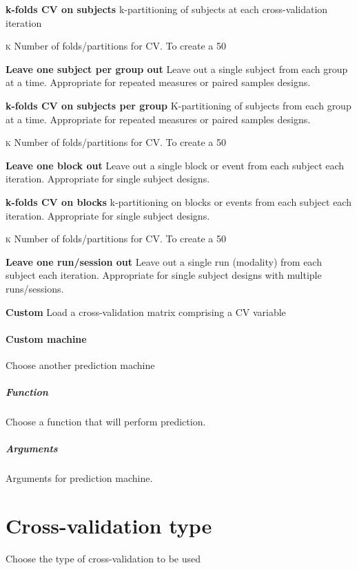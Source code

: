 \textbf{k-folds CV on subjects}
k-partitioning of subjects at each cross-validation iteration


\textsc{k}
Number of folds/partitions for CV. To create a 50%


\textbf{Leave one subject per group out}
Leave out a single subject from each group at a time. Appropriate for repeated measures or paired samples designs.


\textbf{k-folds CV on subjects per group}
K-partitioning of subjects from each group at a time. Appropriate for repeated measures or paired samples designs.


\textsc{k}
Number of folds/partitions for CV. To create a 50%


\textbf{Leave one block out}
Leave out a single block or event from each subject each iteration. Appropriate for single subject designs.


\textbf{k-folds CV on blocks}
k-partitioning on blocks or events from each subject each iteration. Appropriate for single subject designs.


\textsc{k}
Number of folds/partitions for CV. To create a 50%


\textbf{Leave one run/session out}
Leave out a single run (modality) from each subject each iteration. Appropriate for single subject designs with multiple runs/sessions.


\textbf{Custom}
Load a cross-validation matrix comprising a CV variable


\paragraph{Custom machine}
Choose another prediction machine


\subparagraph{Function}
Choose a function that will perform prediction.


\subparagraph{Arguments}
Arguments for prediction machine.


\section{Cross-validation type}
Choose the type of cross-validation to be used


